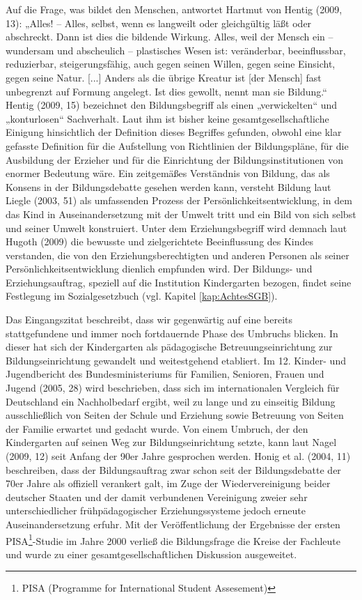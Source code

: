 Auf die Frage, was bildet den Menschen, antwortet Hartmut von Hentig (2009, 13): „Alles! -- Alles, selbst, wenn es langweilt oder gleichgültig läßt oder abschreckt. Dann ist dies die bildende Wirkung. Alles, weil der Mensch ein -- wundersam und abscheulich -- plastisches Wesen ist: veränderbar, be\-einflussbar, reduzierbar, steigerungsfähig, auch gegen seinen Willen, gegen seine Einsicht, gegen seine Natur. [...] Anders als die übrige Kreatur ist [der Mensch] fast unbegrenzt auf Formung angelegt. Ist dies gewollt, nennt man sie Bildung.“ 
Hentig (2009, 15) bezeichnet den Bildungsbegriff als einen „verwickelten“ und „konturlosen“ Sachverhalt. Laut ihm ist bisher keine gesamtgesellschaftliche Einigung hinsichtlich der Definition dieses Begriffes gefunden, obwohl eine klar gefasste Definition für die Aufstellung von Richtlinien der Bildungspläne, für die Ausbildung der Erzieher und für die Einrichtung der Bildungsinstitutionen von enormer Bedeutung wäre. 
Ein zeitgemäßes Verständnis von Bildung, das als Konsens in der Bildungsdebatte gesehen werden kann, versteht Bildung laut Liegle (2003, 51) als umfassenden Prozess der Persönlichkeitsentwicklung, in dem das Kind in Auseinandersetzung mit der Umwelt tritt und ein  Bild von sich selbst und seiner Umwelt konstruiert. Unter dem Erziehungsbegriff wird demnach laut Hugoth (2009) die bewusste und zielgerichtete Beeinflussung des Kindes verstanden, die von den Erziehungsberechtigten und anderen Personen als seiner Persönlichkeitsentwicklung dienlich empfunden wird. Der Bildungs- und Erziehungsauftrag, speziell auf die Institution Kindergarten bezogen, findet seine Festlegung im Sozialgesetzbuch (vgl. Kapitel \ref{kap:AchtesSGB}). 

Das Eingangszitat beschreibt, dass wir gegenwärtig auf eine bereits stattgefundene und immer noch fortdauernde Phase des Umbruchs blicken. In dieser hat sich der Kindergarten als pädagogische Betreuungseinrichtung zur Bildungseinrichtung gewandelt und weitestgehend etabliert. Im 12. Kinder- und Jugendbericht des Bundesministeriums für Familien, Senioren, Frauen und Jugend (2005, 28) wird beschrieben, dass sich im internationalen Vergleich für Deutschland ein Nachholbedarf ergibt, weil zu lange und zu einseitig Bildung ausschließlich von Seiten der Schule und Erziehung sowie Betreuung von Seiten der Familie erwartet und gedacht wurde. Von einem Umbruch, der den Kindergarten auf seinen Weg zur Bildungseinrichtung setzte, kann laut Nagel (2009, 12) seit Anfang der 90er Jahre gesprochen werden. Honig et al. (2004, 11) beschreiben, dass der Bildungsauftrag zwar schon seit der Bildungsdebatte der 70er Jahre als offiziell verankert galt, im Zuge der Wiedervereinigung beider deutscher Staaten und der damit verbundenen Vereinigung zweier sehr unterschiedlicher frühpädagogischer Erziehungssysteme jedoch erneute Auseinandersetzung erfuhr. Mit der Veröffentlichung der Ergebnisse der ersten PISA\footnote{PISA (Programme for International Student Assesement)}-Studie im Jahre 2000 verließ die Bildungsfrage die Kreise der Fachleute und wurde zu einer gesamtgesellschaftlichen Diskussion ausgeweitet.  

